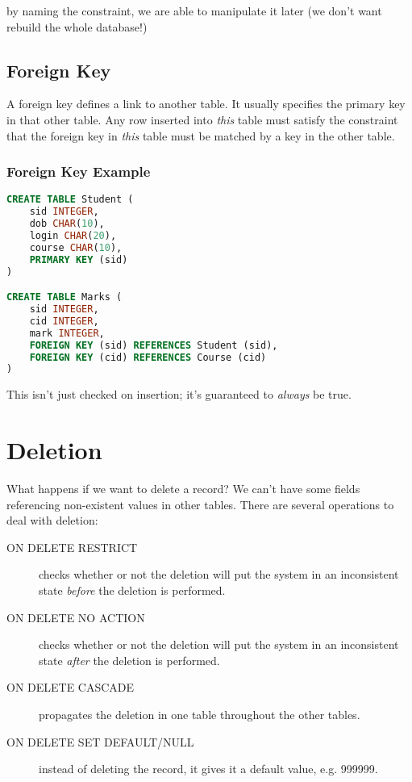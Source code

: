 by naming the constraint, we are able to manipulate it later (we don't want rebuild the whole database!)

\subsection{Foreign Key}
A foreign key defines a link to another table. It usually specifies the primary key in that other table. Any row inserted into \textit{this} table must	satisfy the constraint that the foreign key in \textit{this} table must be matched by a key in the other table.

\subsubsection{Foreign Key Example}
\begin{lstlisting}[language=SQL,tabsize=3]
CREATE TABLE Student (
	sid INTEGER,
	dob CHAR(10),
	login CHAR(20),
	course CHAR(10),
	PRIMARY KEY (sid)
)

CREATE TABLE Marks (
	sid INTEGER,
	cid INTEGER,
	mark INTEGER,
	FOREIGN KEY (sid) REFERENCES Student (sid),
	FOREIGN KEY (cid) REFERENCES Course (cid)
)
\end{lstlisting}

This isn't just checked on insertion; it's guaranteed to \textit{always} be true.

\section{Deletion}
What happens if we want to delete a record? We can't have some fields referencing non-existent values in other tables. There are several operations to deal with deletion:

\begin{description}
	\item[ON DELETE RESTRICT] checks whether or not the deletion will put the system in an inconsistent state \textit{before} the deletion is performed.
	\item[ON DELETE NO ACTION] checks whether or not the deletion will put the system in an inconsistent state \textit{after} the deletion is performed.
	\item[ON DELETE CASCADE] propagates the deletion in one table throughout the other tables.
	\item[ON DELETE SET DEFAULT/NULL] instead of deleting the record, it gives it a default value, e.g. 999999.
\end{description}

